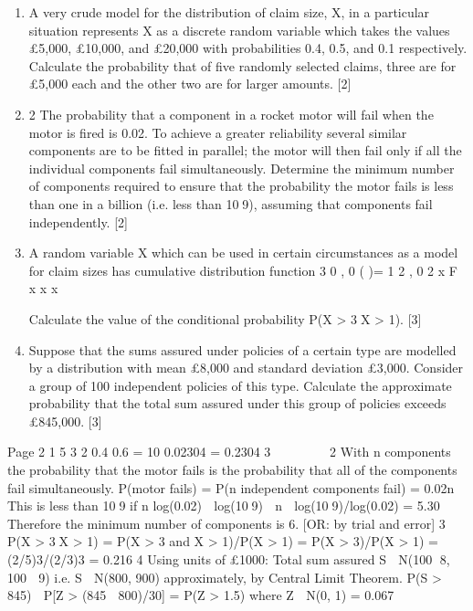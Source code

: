 \documentclass[a4paper,12pt]{article}
\begin{document}
\begin{enumerate}
\item A very crude model for the distribution of claim size, X, in a particular situation
represents X as a discrete random variable which takes the values £5,000, £10,000,
and £20,000 with probabilities 0.4, 0.5, and 0.1 respectively.
Calculate the probability that of five randomly selected claims, three are for £5,000
each and the other two are for larger amounts. [2]
\item 2 The probability that a component in a rocket motor will fail when the motor is fired is
0.02. To achieve a greater reliability several similar components are to be fitted in
parallel; the motor will then fail only if all the individual components fail
simultaneously.
Determine the minimum number of components required to ensure that the
probability the motor fails is less than one in a billion (i.e. less than 109), assuming
that components fail independently. [2]
\item A random variable X which can be used in certain circumstances as a model for claim
sizes has cumulative distribution function
3
0 , 0
( )= 1 2 , 0
2
x
F x
x
x
 
 
  	 
 
   

Calculate the value of the conditional probability P(X > 3X > 1). [3]
\item Suppose that the sums assured under policies of a certain type are modelled by a
distribution with mean £8,000 and standard deviation £3,000. Consider a group of
100 independent policies of this type.
Calculate the approximate probability that the total sum assured under this group of
policies exceeds £845,000. [3]
\end{enumerate}

Page 2
1 5 3 2
0.4 0.6 = 10 0.02304 = 0.2304
3
 
  
 
2 With n components the probability that the motor fails is the probability that all of the
components fail simultaneously.
P(motor fails) = P(n independent components fail) = 0.02n
This is less than 109 if n log(0.02)  log(109)  n  log(109)/log(0.02) = 5.30
Therefore the minimum number of components is 6.
[OR: by trial and error]
3 P(X > 3X > 1) = P(X > 3 and X > 1)/P(X > 1) = P(X > 3)/P(X > 1)
= (2/5)3/(2/3)3 = 0.216
4 Using units of £1000:
Total sum assured S  N(100  8, 100  9) i.e. S  N(800, 900) approximately, by
Central Limit Theorem.
P(S > 845)  P[Z > (845  800)/30] = P(Z > 1.5) where Z  N(0, 1)
= 0.067
\end{document}
